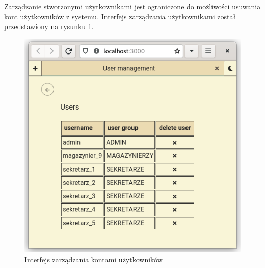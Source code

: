 Zarządzanie stworzonymi użytkownikami jest ograniczone do możliwości usuwania
kont użytkowników z systemu. Interfejs zarządzania użytkownikami został
przedstawiony na rysunku \ref{userManagementFigure}.

\begin{figure}[h]
    \centering
    \includegraphics[width=.6\textwidth]{./img/user_management.png}
    \caption{Interfejs zarządzania kontami użytkowników}
    \label{userManagementFigure}
\end{figure}
